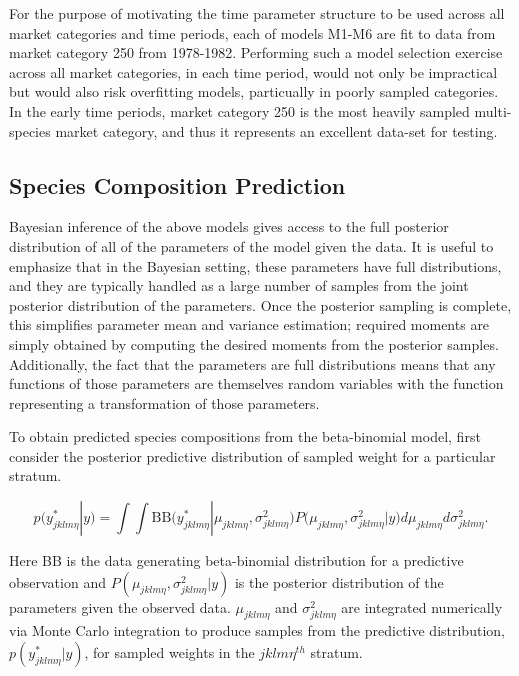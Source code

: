 \documentclass[12pt]{article}
\begin{document}
For the purpose of motivating the time parameter structure to be used across 
all market categories and time periods, each of models M1-M6 are fit to data 
from market category 250 from 1978-1982. %
Performing such a model selection exercise across all market categories, in 
each time period, would not only be impractical but would also risk overfitting 
models, particually in poorly sampled categories. In the early time periods, 
market category 250 is the most heavily sampled multi-species market category, 
and thus it represents an excellent data-set for testing.


\subsection{Species Composition Prediction}\label{species-composition-prediction}

Bayesian inference of the above models gives access to the full
posterior distribution of all of the parameters of the model given the
data. It is useful to emphasize that in the Bayesian setting, these
parameters have full distributions, and they are typically handled as a
large number of samples from the joint posterior distribution of the
parameters. Once the posterior sampling is complete, this simplifies
parameter mean and variance estimation; required moments are simply
obtained by computing the desired moments from the posterior samples.
Additionally, the fact that the parameters are full distributions means
that any functions of those parameters are themselves random variables
with the function representing a transformation of those parameters.

To obtain predicted species compositions from the beta-binomial model, first 
consider the posterior predictive distribution of sampled weight for a 
particular stratum.

\[p(y^*_{jklm\eta}|y) = \int\!\!\!\!\int\! \text{BB}\Big( y^*_{jklm\eta}|\mu_{jklm\eta}, \sigma^2_{jklm\eta} \Big) P\Big(\mu_{jklm\eta}, \sigma^2_{jklm\eta} | y\Big) d\mu_{jklm\eta} d\sigma^2_{jklm\eta}.\]

Here BB is the data generating beta-binomial distribution for a
predictive observation and \(P(\mu_{jklm\eta}, \sigma^2_{jklm\eta}|y)\)
is the posterior distribution of the parameters given the observed data.
\(\mu_{jklm\eta}\) and \(\sigma^2_{jklm\eta}\) are integrated numerically via 
Monte Carlo integration to produce samples from the predictive distribution, 
\(p(y^*_{jklm\eta}|y)\), for sampled weights in the \(jklm\eta^{th}\) stratum.
\end{document}
